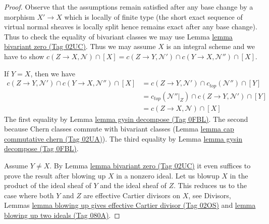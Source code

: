 \documentclass{amsart}
\theoremstyle{plain}
\theoremstyle{definition}
\theoremstyle{remark}
\numberwithin{equation}{subsection}
\begin{document}
\begin{proof}
Observe that the assumptions remain satisfied after any base change
by a morphism $X' \to X$ which is locally of finite type (the short
exact sequence of virtual normal sheaves is locally split hence
remains exact after any base change). Thus to check the
equality of bivariant classes we may use Lemma \href{https://stacks.math.columbia.edu/tag/02UC}{lemma bivariant zero (Tag 02UC)}.
Thus we may assume $X$ is an integral scheme and we have to show
$c(Z \to X, \mathcal{N}) \cap [X] =
c(Z \to Y, \mathcal{N}') \cap c(Y \to X, \mathcal{N}'') \cap [X]$.

\medskip\noindent
If $Y = X$, then we have
\begin{align*}
c(Z \to Y, \mathcal{N}') \cap c(Y \to X, \mathcal{N}'') \cap [X]
& =
c(Z \to Y, \mathcal{N}') \cap c_{top}(\mathcal{N}'') \cap [Y] \\
& =
c_{top}(\mathcal{N}''|_Z) \cap c(Z \to Y, \mathcal{N}') \cap [Y] \\
& =
c(Z \to X, \mathcal{N}) \cap [X] 
\end{align*}
The first equality by Lemma \href{https://stacks.math.columbia.edu/tag/0FBL}{lemma gysin decompose (Tag 0FBL)}.
The second because Chern classes commute with bivariant classes
(Lemma \href{https://stacks.math.columbia.edu/tag/02UA}{lemma cap commutative chern (Tag 02UA)}).
The third equality by Lemma \href{https://stacks.math.columbia.edu/tag/0FBL}{lemma gysin decompose (Tag 0FBL)}.

\medskip\noindent
Assume $Y \not = X$. By Lemma \href{https://stacks.math.columbia.edu/tag/02UC}{lemma bivariant zero (Tag 02UC)}
it even suffices to prove the result after blowing up $X$ in a nonzero ideal.
Let us blowup $X$ in the product of the ideal sheaf of $Y$ and the ideal
sheaf of $Z$. This reduces us to the case where both $Y$ and $Z$ are
effective Cartier divisors on $X$, see
Divisors, Lemmas
\href{https://stacks.math.columbia.edu/tag/02OS}{lemma blowing up gives effective Cartier divisor (Tag 02OS)} and
\href{https://stacks.math.columbia.edu/tag/080A}{lemma blowing up two ideals (Tag 080A)}.


\end{proof}
\end{document}
